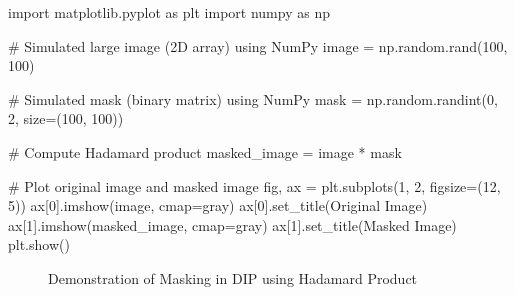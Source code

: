 \documentclass[
  letterpaper,
  DIV=11,
  numbers=noendperiod]{scrreprt}
\newenvironment{Shaded}{\begin{snugshade}}{\end{snugshade}}
\newcommand{\CommentTok}[1]{\textcolor[rgb]{0.37,0.37,0.37}{#1}}
\newcommand{\DecValTok}[1]{\textcolor[rgb]{0.68,0.00,0.00}{#1}}
\newcommand{\ImportTok}[1]{\textcolor[rgb]{0.00,0.46,0.62}{#1}}
\newcommand{\NormalTok}[1]{\textcolor[rgb]{0.00,0.23,0.31}{#1}}
\newcommand{\OperatorTok}[1]{\textcolor[rgb]{0.37,0.37,0.37}{#1}}
\newcommand{\StringTok}[1]{\textcolor[rgb]{0.13,0.47,0.30}{#1}}
\theoremstyle{plain}
\theoremstyle{definition}
\theoremstyle{remark}
\begin{document}
\begin{Shaded}
\begin{Highlighting}[]
\ImportTok{import}\NormalTok{ matplotlib.pyplot }\ImportTok{as}\NormalTok{ plt}
\ImportTok{import}\NormalTok{ numpy }\ImportTok{as}\NormalTok{ np}

\CommentTok{\# Simulated large image (2D array) using NumPy}
\NormalTok{image }\OperatorTok{=}\NormalTok{ np.random.rand(}\DecValTok{100}\NormalTok{, }\DecValTok{100}\NormalTok{)}

\CommentTok{\# Simulated mask (binary matrix) using NumPy}
\NormalTok{mask }\OperatorTok{=}\NormalTok{ np.random.randint(}\DecValTok{0}\NormalTok{, }\DecValTok{2}\NormalTok{, size}\OperatorTok{=}\NormalTok{(}\DecValTok{100}\NormalTok{, }\DecValTok{100}\NormalTok{))}

\CommentTok{\# Compute Hadamard product}
\NormalTok{masked\_image }\OperatorTok{=}\NormalTok{ image }\OperatorTok{*}\NormalTok{ mask}

\CommentTok{\# Plot original image and masked image}
\NormalTok{fig, ax }\OperatorTok{=}\NormalTok{ plt.subplots(}\DecValTok{1}\NormalTok{, }\DecValTok{2}\NormalTok{, figsize}\OperatorTok{=}\NormalTok{(}\DecValTok{12}\NormalTok{, }\DecValTok{5}\NormalTok{))}
\NormalTok{ax[}\DecValTok{0}\NormalTok{].imshow(image, cmap}\OperatorTok{=}\StringTok{\textquotesingle{}gray\textquotesingle{}}\NormalTok{)}
\NormalTok{ax[}\DecValTok{0}\NormalTok{].set\_title(}\StringTok{\textquotesingle{}Original Image\textquotesingle{}}\NormalTok{)}
\NormalTok{ax[}\DecValTok{1}\NormalTok{].imshow(masked\_image, cmap}\OperatorTok{=}\StringTok{\textquotesingle{}gray\textquotesingle{}}\NormalTok{)}
\NormalTok{ax[}\DecValTok{1}\NormalTok{].set\_title(}\StringTok{\textquotesingle{}Masked Image\textquotesingle{}}\NormalTok{)}
\NormalTok{plt.show()}
\end{Highlighting}
\end{Shaded}

\begin{figure}[H]


\caption{\label{fig-imgmask}Demonstration of Masking in DIP using
Hadamard Product}

\end{figure}%
\end{document}
